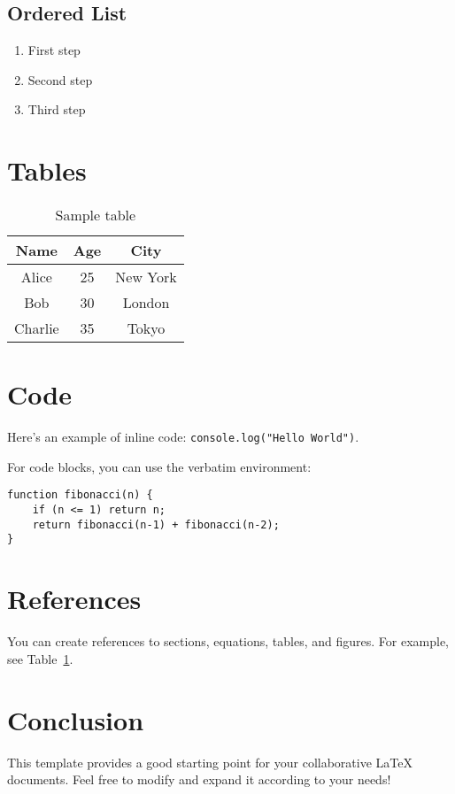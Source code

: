 \documentclass{article}
\begin{document}
\subsection{Ordered List}
\begin{enumerate}
    \item First step
    \item Second step
    \item Third step
\end{enumerate}

\section{Tables}

\begin{table}[h]
\centering
\begin{tabular}{|c|c|c|}
\hline
Name & Age & City \\
\hline
Alice & 25 & New York \\
Bob & 30 & London \\
Charlie & 35 & Tokyo \\
\hline
\end{tabular}
\caption{Sample table}
\label{tab:sample}
\end{table}

\section{Code}

Here's an example of inline code: \texttt{console.log("Hello World")}.

For code blocks, you can use the verbatim environment:
\begin{verbatim}
function fibonacci(n) {
    if (n <= 1) return n;
    return fibonacci(n-1) + fibonacci(n-2);
}
\end{verbatim}

\section{References}

You can create references to sections, equations, tables, and figures. For example, see Table~\ref{tab:sample}.

\section{Conclusion}

This template provides a good starting point for your collaborative LaTeX documents. Feel free to modify and expand it according to your needs!
\end{document}
